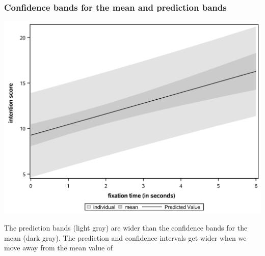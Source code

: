 \documentclass{beamer}
\begin{document}
\begin{frame}[fragile]
\frametitle{Confidence bands for the mean and prediction bands}
\begin{center}
\includegraphics[width = 0.75\linewidth]{img/c2/slides3-e17}
\end{center}
{\footnotesize The prediction bands (light gray) are wider than the confidence bands for the mean (dark gray). The prediction and confidence intervals get wider when we move away from the mean value of 

}
\end{frame}
  
\end{document}
